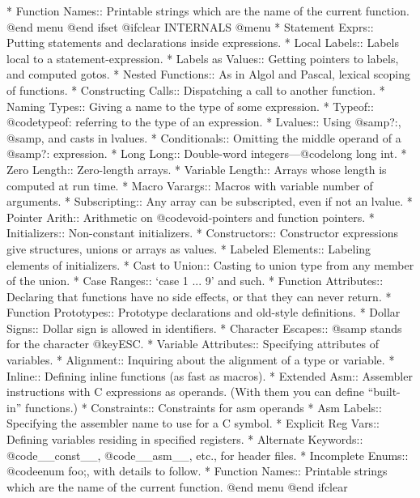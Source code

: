 * Function Names::	Printable strings which are the name of the current
			 function.
@end menu
@end ifset
@ifclear INTERNALS
@menu
* Statement Exprs::     Putting statements and declarations inside expressions.
* Local Labels::        Labels local to a statement-expression.
* Labels as Values::    Getting pointers to labels, and computed gotos.
* Nested Functions::    As in Algol and Pascal, lexical scoping of functions.
* Constructing Calls::	Dispatching a call to another function.
* Naming Types::        Giving a name to the type of some expression.
* Typeof::              @code{typeof}: referring to the type of an expression.
* Lvalues::             Using @samp{?:}, @samp{,} and casts in lvalues.
* Conditionals::        Omitting the middle operand of a @samp{?:} expression.
* Long Long::		Double-word integers---@code{long long int}.
* Zero Length::         Zero-length arrays.
* Variable Length::     Arrays whose length is computed at run time.
* Macro Varargs::	Macros with variable number of arguments.
* Subscripting::        Any array can be subscripted, even if not an lvalue.
* Pointer Arith::       Arithmetic on @code{void}-pointers and function pointers.
* Initializers::        Non-constant initializers.
* Constructors::        Constructor expressions give structures, unions
                         or arrays as values.
* Labeled Elements::	Labeling elements of initializers.
* Cast to Union::       Casting to union type from any member of the union.
* Case Ranges::		`case 1 ... 9' and such.
* Function Attributes:: Declaring that functions have no side effects,
                         or that they can never return.
* Function Prototypes:: Prototype declarations and old-style definitions.
* Dollar Signs::        Dollar sign is allowed in identifiers.
* Character Escapes::   @samp{\e} stands for the character @key{ESC}.
* Variable Attributes::	Specifying attributes of variables.
* Alignment::           Inquiring about the alignment of a type or variable.
* Inline::              Defining inline functions (as fast as macros).
* Extended Asm::        Assembler instructions with C expressions as operands.
                         (With them you can define ``built-in'' functions.)
* Constraints::         Constraints for asm operands
* Asm Labels::          Specifying the assembler name to use for a C symbol.
* Explicit Reg Vars::   Defining variables residing in specified registers.
* Alternate Keywords::  @code{__const__}, @code{__asm__}, etc., for header files.
* Incomplete Enums::    @code{enum foo;}, with details to follow.
* Function Names::	Printable strings which are the name of the current
			 function.
@end menu
@end ifclear

